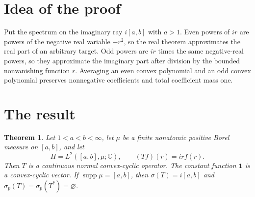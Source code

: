 \documentclass[11pt]{article}
\newtheorem{theorem}{Theorem}
\begin{document}
\section{Idea of the proof}

Put the spectrum on the imaginary ray $i[a,b]$ with $a>1$.  Even powers of
$ir$ are powers of the negative real variable $-r^2$, so the real theorem
approximates the real part of an arbitrary target.  Odd powers are $ir$ times
the same negative-real powers, so they approximate the imaginary part after
division by the bounded nonvanishing function $r$.  Averaging an even convex
polynomial and an odd convex polynomial preserves nonnegative coefficients
and total coefficient mass one.

\section{The result}

\begin{theorem}\label{thm:main}
Let $1<a<b<\infty$, let $\mu$ be a finite nonatomic positive Borel measure on
$[a,b]$, and let
\[
   H=L^2([a,b],\mu;\mathbb C),\qquad
   (Tf)(r)=irf(r).
\]
Then $T$ is a continuous normal convex-cyclic operator.  The constant function
$\mathbf 1$ is a convex-cyclic vector.  If $\operatorname{supp}\mu=[a,b]$,
then $\sigma(T)=i[a,b]$ and $\sigma_p(T)=\sigma_p(T^*)=\varnothing$.
\end{theorem}
\end{document}
